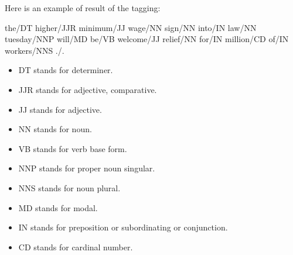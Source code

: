 Here is an example of result of the tagging: 

the/DT higher/JJR minimum/JJ wage/NN sign/NN into/IN law/NN tuesday/NNP will/MD be/VB welcome/JJ relief/NN for/IN million/CD of/IN workers/NNS ./.

\begin{itemize}
	\item DT stands for determiner.
	\item JJR stands for adjective, comparative.
    \item JJ stands for adjective.
    \item NN stands for noun.
    \item VB stands for verb base form.
    \item NNP stands for proper noun singular.
    \item NNS stands for noun plural.
    \item MD stands for modal.
    \item IN stands for preposition or subordinating or conjunction.
    \item CD stands for cardinal number.

\end{itemize}


